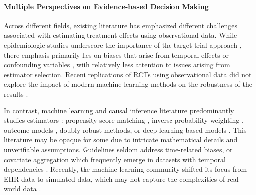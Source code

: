 \documentclass[10pt,letterpaper]{article}
\begin{document}

\paragraph{Multiple Perspectives on Evidence-based Decision Making}
Across different fields, existing literature has emphasized different challenges associated
with estimating treatment effects using observational data. While epidemiologic
studies underscore the importance of the target trial approach
\cite{von2007strengthening,benchimol2015reporting,hernan2020causal,schneeweiss2021conducting,zeng2022uncovering},
there emphasis primarily lies on biases that arise from temporal effects \cite{suissa2008immortal,Oke2021leadtimebias,fu2021timing,hernan2016specifying,wang2022understanding,Bankhead2017attritionbias} or confounding variables \cite{greenland1999causal,vanderweele2019principles,loh2021confounder}, with
relatively less attention to issues arising from estimator selection.
Recent replications of RCTs using observational data did not explore the impact
of modern machine learning methods on the robustness of the results
\cite{schneeweiss2021conducting,wang2023emulation}.

In contrast, machine learning and causal inference literature predominantly
studies estimators
\cite{belloni2014high,chernozhukov2018double,shalit2016tutorial,sharma2018tutorial,moraffah2021causal}
: propensity score matching \cite{stuart2010matching}, inverse probability
weighting \cite{austin2015moving}, outcome models \cite{robins1986role}, doubly
robust methods, \cite{chernozhukov2018double} or deep learning based models
\cite{johansson2022generalization}. This literature may be opaque for some due to intricate mathematical details and unverifiable assumptions. Guidelines seldom
address time-related biases, or covariate aggregation which
frequently emerge in datasets with temporal dependencies
\cite{suissa2008immortal,fu2021timing}. Recently, the machine learning community
shifted its focus from EHR data to simulated data, which may not capture the
complexities of real-world data \cite{schuler2017targeted,dorie2019automated,
  alaa2019validating, curth2021really}.
\end{document}
